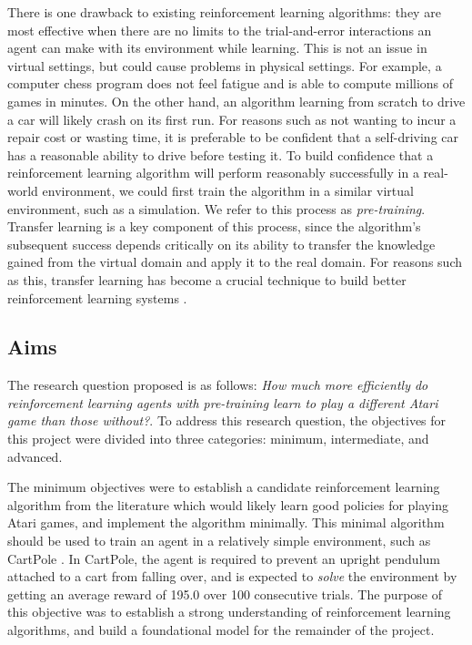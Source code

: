 \documentclass[12pt,a4paper]{article}
\begin{document}
There is one drawback to existing reinforcement learning algorithms: they are most effective when there are no limits to the trial-and-error interactions an agent can make with its environment while learning. This is not an issue in virtual settings, but could cause problems in physical settings. For example, a computer chess program does not feel fatigue and is able to compute millions of games in minutes. On the other hand, an algorithm learning from scratch to drive a car will likely crash on its first run. For reasons such as not wanting to incur a repair cost or wasting time, it is preferable to be confident that a self-driving car has a reasonable ability to drive before testing it. To build confidence that a reinforcement learning algorithm will perform reasonably successfully in a real-world environment, we could first train the algorithm in a similar virtual environment, such as a simulation. We refer to this process as \textit{pre-training}. Transfer learning is a key component of this process, since the algorithm's subsequent success depends critically on its ability to transfer the knowledge gained from the virtual domain and apply it to the real domain. For reasons such as this, transfer learning has become a crucial technique to build better reinforcement learning systems \cite{}. 

\subsection{Aims}
The research question proposed is as follows: \textit{How much more efficiently do reinforcement learning agents with pre-training learn to play a different Atari game than those without?}. To address this research question, the objectives for this project were divided into three categories: minimum, intermediate, and advanced. 

The minimum objectives were to establish a candidate reinforcement learning algorithm from the literature which would likely learn good policies for playing Atari games, and implement the algorithm minimally. This minimal algorithm should be used to train an agent in a relatively simple environment, such as CartPole \cite{}. In CartPole, the agent is required to prevent an upright pendulum attached to a cart from falling over, and is expected to \textit{solve} the environment by getting an average reward of 195.0 over 100 consecutive trials. The purpose of this objective was to establish a strong understanding of reinforcement learning algorithms, and build a foundational model for the remainder of the project.
\end{document}

